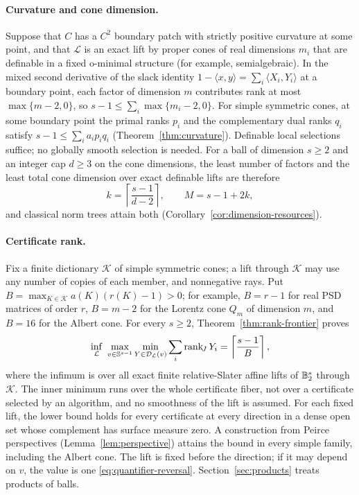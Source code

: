 \paragraph{Curvature and cone dimension.}
Suppose that $C$ has a $C^2$ boundary patch with strictly positive
curvature at some point, and that $\mathcal L$ is an exact lift by
proper cones of real dimensions $m_i$ that are definable in a fixed
o-minimal structure (for example, semialgebraic). In the mixed second
derivative of the slack identity $1-\langle x,y\rangle=\sum_i\langle
X_i,Y_i\rangle$ at a boundary point, each factor of dimension $m$
contributes rank at most $\max\{m-2,0\}$, so
$s-1\leq\sum_i\max\{m_i-2,0\}$. For simple symmetric cones, at some
boundary point the primal ranks $p_i$ and the complementary dual ranks
$q_i$ satisfy $s-1\leq\sum_ia_ip_iq_i$ (Theorem~\ref{thm:curvature}).
Definable local selections suffice; no globally smooth selection is
needed. For a ball of dimension $s\geq2$ and an integer cap $d\geq3$ on
the cone dimensions, the least number of factors and the least total
cone dimension over exact definable lifts are therefore
\[
 k=\left\lceil\frac{s-1}{d-2}\right\rceil,
 \qquad M=s-1+2k,
\]
and classical norm trees attain both
(Corollary~\ref{cor:dimension-resources}).

\paragraph{Certificate rank.}
Fix a finite dictionary $\mathscr K$ of simple symmetric cones; a lift
through $\mathscr K$ may use any number of copies of each member, and
nonnegative rays. Put $B=\max_{K\in\mathscr K}a(K)(r(K)-1)>0$; for
example, $B=r-1$ for real PSD matrices of order $r$, $B=m-2$ for the
Lorentz cone $Q_m$ of dimension $m$, and $B=16$ for the Albert cone. For
every $s\geq2$, Theorem~\ref{thm:rank-frontier} proves
\begin{equation}\label{eq:intro-rank}
 \inf_{\mathcal L}\ \max_{v\in\mathbb S^{s-1}}
 \min_{Y\in\mathcal D_{\mathcal L}(v)}\sum_i\operatorname{rank}_{\!J} Y_i
 =\left\lceil\frac{s-1}{B}\right\rceil,
\end{equation}
where the infimum is over all exact finite relative-Slater affine lifts
of $\mathbb B_2^s$ through $\mathscr K$. The inner minimum runs over the whole
certificate fiber, not over a certificate selected by an algorithm, and
no smoothness of the lift is assumed. For each fixed lift, the lower
bound holds for every certificate at every direction in a dense open set
whose complement has surface measure zero. A construction from Peirce
perspectives (Lemma~\ref{lem:perspective}) attains the bound in every
simple family, including the Albert cone. The lift is fixed before the
direction; if it may depend on $v$, the value is one
\eqref{eq:quantifier-reversal}. Section~\ref{sec:products} treats
products of balls.

